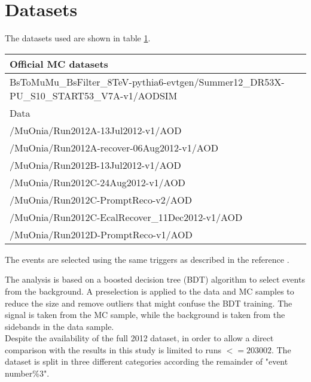 \section{Datasets}

The datasets used are shown in table \ref{tab:datasets}.
\begin{table}
\begin{tabular}{|l|}
\hline
Official MC datasets \\
\hline
BsToMuMu\_BsFilter\_8TeV-pythia6-evtgen/Summer12\_DR53X-PU\_S10\_START53\_V7A-v1/AODSIM \\
\hline
Data \\
/MuOnia/Run2012A-13Jul2012-v1/AOD \\
/MuOnia/Run2012A-recover-06Aug2012-v1/AOD \\
/MuOnia/Run2012B-13Jul2012-v1/AOD \\
/MuOnia/Run2012C-24Aug2012-v1/AOD \\
/MuOnia/Run2012C-PromptReco-v2/AOD \\
/MuOnia/Run2012C-EcalRecover\_11Dec2012-v1/AOD \\
/MuOnia/Run2012D-PromptReco-v1/AOD \\
\hline
\end{tabular}
\label{tab:datasets}
\end{table}

The events are selected using the same triggers as described in the reference \cite{MainAN}.

The analysis is based on a boosted decision tree (BDT) algorithm to select \BsMuMu events from the
background.
A preselection is applied to the data and MC samples to reduce the size and remove outliers that
might confuse the BDT training.
The signal is taken from the \BsMuMu MC sample, while the background is taken from the sidebands
in the data sample.
\\
Despite the availability of the full 2012 dataset, in order to allow a direct comparison with
the results in \cite{MainAN} this study is limited to runs $<= 203002$.
The dataset is split in three different categories according the remainder of "event number$\%3$".
